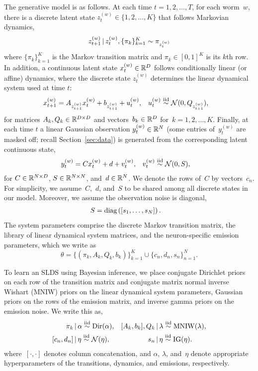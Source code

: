 \documentclass[11pt]{article}
\begin{document}
The generative model is as follows. At each time ${t=1,2,\ldots,T}$,
for each worm~$w$,
there is a discrete latent state ${z_t^{(w)} \in \{1,2, \ldots,K\}}$ that
follows Markovian dynamics,
\begin{equation}
  z_{t+1}^{(w)} \,|\, z_t^{(w)}, \{\pi_k\}_{k=1}^K  \sim \pi_{z_t^{(w)}}
  \label{eq:markov_z}
\end{equation}
where ${\{\pi_k\}_{k=1}^K}$ is the Markov transition matrix and
${\pi_k \in [0,1]^K}$ is its $k$th row. 
In addition, a continuous latent state ${x_t^{(w)} \in \mathbb{R}^D}$ follows
conditionally linear (or affine) dynamics, where the discrete state $z_t^{(w)}$
determines the linear dynamical system used at time $t$:
\begin{align}
  x_{t+1}^{(w)} &= A_{z_{t+1}^{(w)}} x_{t}^{(w)} + b_{z_{t+1}^{(w)}} +  u_t^{(w)},
  &
  u_t^{(w)} &\stackrel{\text{iid}}{\sim} \mathcal{N}(0,Q_{z_{t+1}^{(w)}}),
  \label{eq:slds_start}
\end{align}
for matrices ${A_k, Q_k \in \mathbb{R}^{D \times D}}$ and vectors~${b_k\in
\mathbb{R}^D}$ for~${k=1,2,\ldots,K}$.
Finally, at each time $t$ a linear Gaussian observation $y_t^{(w)} \in \mathbb{R}^N$
(some entries of~$y_t^{(w)}$ are masked off; recall Section~\ref{sec:data}) is
generated from the corresponding latent continuous state,
\begin{align}
  y_t^{(w)} &= C x_t^{(w)} + d + v_t^{(w)}, & v_t^{(w)} &\stackrel{\text{iid}}{\sim} \mathcal{N}(0,S),
    \label{eq:slds_end}
\end{align}
for $C \in \mathbb{R}^{N \times D}$, $S \in \mathbb{R}^{N \times N}$,
and~$d \in \mathbb{R}^N$. We denote the rows of~$C$ by vectors~$c_n$.
For simplicity, we assume~$C$,~$d$, and~$S$ to
be shared among all discrete states in our model.  Moreover, we assume
the observation noise is diagonal,
\begin{align*}
  S &= \textrm{diag}\left(\left[s_{1}, \ldots, s_{N} \right] \right). 
\end{align*}
The system parameters comprise the discrete Markov transition matrix, the
library of linear dynamical system matrices, and the neuron-specific
emission parameters, which we write as
\begin{equation*}
  \theta = \{(\pi_k, A_k, Q_k, b_k)\}_{k=1}^K \cup \{c_n, d_n, s_n\}_{n=1}^N.
\end{equation*}

To learn an SLDS using Bayesian inference, we place conjugate Dirichlet priors
on each row of the transition matrix and conjugate matrix normal
inverse Wishart (MNIW) priors on the linear dynamical system parameters,
Gaussian priors on the rows of the emission matrix,
and inverse gamma priors on the emission noise.
We write this as,
\begin{align*}
  \pi_k &\,|\, \alpha \stackrel{\text{iid}}{\sim} \mathrm{Dir}(\alpha),
  &
  [A_k, b_k], Q_k &\,|\, \lambda \stackrel{\text{iid}}{\sim} \mathrm{MNIW}(\lambda),
  \\
  [c_n, d_n] &\,|\, \eta \stackrel{\text{iid}}{\sim} \mathcal{N}(\eta),
  &
  s_{n} &\,|\, \eta \stackrel{\text{iid}}{\sim} \mathrm{IG}(\eta).
\end{align*}
where~$[\cdot, \cdot]$ denotes column concatenation, and $\alpha$, $\lambda$,
and~$\eta$ denote appropriate hyperparameters of the transitions, dynamics, and
emissions, respectively.
\end{document}
